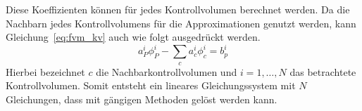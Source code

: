 Diese Koeffizienten können für jedes Kontrollvolumen berechnet werden. Da die Nachbarn jedes
Kontrollvolumens für die Approximationen genutzt werden, kann Gleichung~\eqref{eq:fvm_kv} auch
wie folgt ausgedrückt werden.
\begin{equation}
  a^i_P\phi^i_P - \sum_c a^i_c\phi^i_c = b^i_p
\end{equation}
Hierbei bezeichnet $c$ die Nachbarkontrollvolumen und $i=1,\dots,N$ das
betrachtete Kontrollvolumen. Somit entsteht ein lineares Gleichungssystem mit $N$ Gleichungen,
dass mit gängigen Methoden gelöst werden kann.
\clearpage
